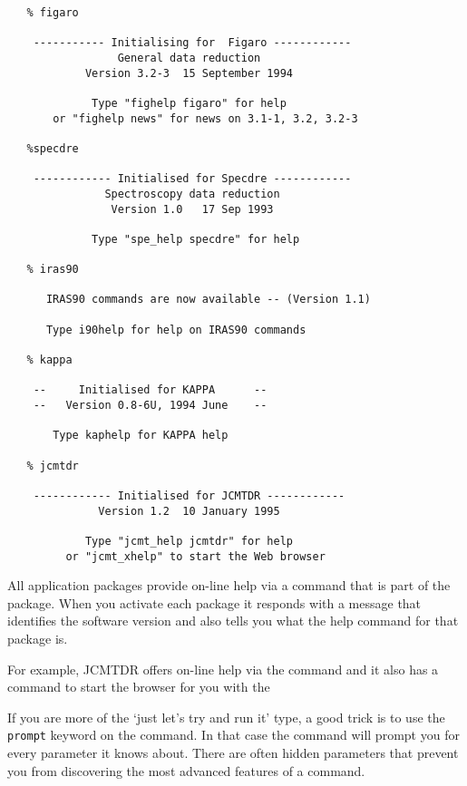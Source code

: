 \begin{verbatim}
   % figaro

    ----------- Initialising for  Figaro ------------
                 General data reduction
            Version 3.2-3  15 September 1994

             Type "fighelp figaro" for help
       or "fighelp news" for news on 3.1-1, 3.2, 3.2-3

   %specdre

    ------------ Initialised for Specdre ------------
               Spectroscopy data reduction
                Version 1.0   17 Sep 1993

             Type "spe_help specdre" for help

   % iras90

      IRAS90 commands are now available -- (Version 1.1)

      Type i90help for help on IRAS90 commands

   % kappa

    --     Initialised for KAPPA      --
    --   Version 0.8-6U, 1994 June    --

       Type kaphelp for KAPPA help

   % jcmtdr

    ------------ Initialised for JCMTDR ------------
              Version 1.2  10 January 1995

            Type "jcmt_help jcmtdr" for help
         or "jcmt_xhelp" to start the Web browser
\end{verbatim}

   All application packages provide on-line help via a command that is
   part of the package. When you activate each package
   it responds with a message that identifies the software version and
   also tells you what the help command for that package is.

   For example, JCMTDR offers on-line help via the command
{\tt {}}
   and it also has a command
{\tt {}}
   to start the
   browser for you with the

   If you are more of the `just let's try and run it' type, a good trick
   is to use the {\tt prompt} keyword on the command. In that case
   the command will prompt you for every parameter it knows about. There
   are often hidden parameters that prevent you from discovering the
   most advanced features of a command.

